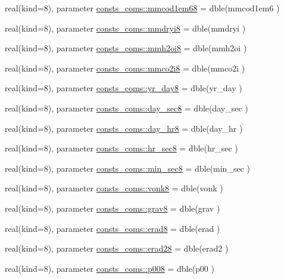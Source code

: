 \begin{DoxyCompactItemize}
\item 
real(kind=8), parameter \hyperlink{namespaceconsts__coms_a22a9b2490e13490aeeeeaffa137cfc47}{consts\+\_\+coms\+::mmcod1em68} = dble(mmcod1em6 )
\item 
real(kind=8), parameter \hyperlink{namespaceconsts__coms_a3c57cfb68a588ad22205f473b45b0473}{consts\+\_\+coms\+::mmdryi8} = dble(mmdryi )
\item 
real(kind=8), parameter \hyperlink{namespaceconsts__coms_aab0676d97b330f74a5658cc5436518b2}{consts\+\_\+coms\+::mmh2oi8} = dble(mmh2oi )
\item 
real(kind=8), parameter \hyperlink{namespaceconsts__coms_a7a5da648279dbc405b51c92733fe9301}{consts\+\_\+coms\+::mmco2i8} = dble(mmco2i )
\item 
real(kind=8), parameter \hyperlink{namespaceconsts__coms_af9fb6bb150a0bc07d04228a98616c962}{consts\+\_\+coms\+::yr\+\_\+day8} = dble(yr\+\_\+day )
\item 
real(kind=8), parameter \hyperlink{namespaceconsts__coms_a00c8967ff3769c4a31bd909961104e13}{consts\+\_\+coms\+::day\+\_\+sec8} = dble(day\+\_\+sec )
\item 
real(kind=8), parameter \hyperlink{namespaceconsts__coms_aa5f4f318d77a39b4f036f10c9d640211}{consts\+\_\+coms\+::day\+\_\+hr8} = dble(day\+\_\+hr )
\item 
real(kind=8), parameter \hyperlink{namespaceconsts__coms_ab0f214f79265c82988672d0e10e674cb}{consts\+\_\+coms\+::hr\+\_\+sec8} = dble(hr\+\_\+sec )
\item 
real(kind=8), parameter \hyperlink{namespaceconsts__coms_a2b5ca6c06d8637515d08d6f29aa48060}{consts\+\_\+coms\+::min\+\_\+sec8} = dble(min\+\_\+sec )
\item 
real(kind=8), parameter \hyperlink{namespaceconsts__coms_aba42a2e8791fbaccb96fdaec989bf033}{consts\+\_\+coms\+::vonk8} = dble(vonk )
\item 
real(kind=8), parameter \hyperlink{namespaceconsts__coms_a61919bc434d4bb58d80ace52558d4404}{consts\+\_\+coms\+::grav8} = dble(grav )
\item 
real(kind=8), parameter \hyperlink{namespaceconsts__coms_abf125d6324bae337a7f09903af9a804e}{consts\+\_\+coms\+::erad8} = dble(erad )
\item 
real(kind=8), parameter \hyperlink{namespaceconsts__coms_a57037c958a453744e08c3297a5718753}{consts\+\_\+coms\+::erad28} = dble(erad2 )
\item 
real(kind=8), parameter \hyperlink{namespaceconsts__coms_a9b5c692d7673876383486b7799a59d94}{consts\+\_\+coms\+::p008} = dble(p00 )

\end{DoxyCompactItemize}
